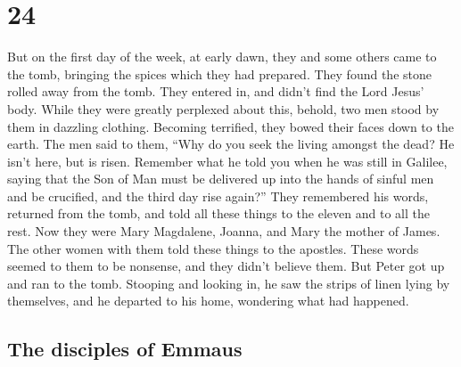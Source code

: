 \hypertarget{section-14}{%
\section{24}\label{section-14}}

 But on the first day of the week, at early dawn, they and
some others came to the tomb, bringing the spices which they had
prepared.  They found the stone rolled away from the tomb.
 They entered in, and didn't find the Lord Jesus' body.
 While they were greatly perplexed about this, behold, two
men stood by them in dazzling clothing.  Becoming
terrified, they bowed their faces down to the earth. The men said to
them, ``Why do you seek the living amongst the dead?  He
isn't here, but is risen. Remember what he told you when he was still in
Galilee,  saying that the Son of Man must be delivered up
into the hands of sinful men and be crucified, and the third day rise
again?''  They remembered his words, 
returned from the tomb, and told all these things to the eleven and to
all the rest.  Now they were Mary Magdalene, Joanna, and
Mary the mother of James. The other women with them told these things to
the apostles.  These words seemed to them to be nonsense,
and they didn't believe them.  But Peter got up and ran
to the tomb. Stooping and looking in, he saw the strips of linen lying
by themselves, and he departed to his home, wondering what had happened.

\hypertarget{the-disciples-of-emmaus}{%
\subsection{The disciples of Emmaus}\label{the-disciples-of-emmaus}}

